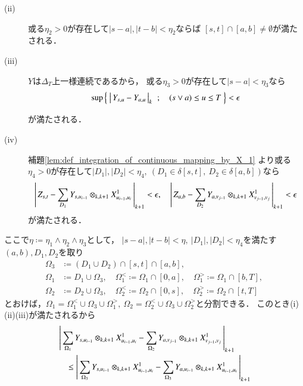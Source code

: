 \begin{prf}
\begin{description}
\begin{description}
					\item[(ii)] 或る$\eta_2 > 0$が存在して$|s-a|,|t-b| < \eta_2$ならば
						$[s,t] \cap [a,b] \neq \emptyset$が満たされる．
						
					\item[(iii)] $Y$は$\Delta_T$上一様連続であるから，
						或る$\eta_3 > 0$が存在して$|s-a| < \eta_3$なら
						\begin{align}
							\operatorname*{sup}_{} \left\{\ \left|\, Y_{s,u} - Y_{a,u}\, \right|_{k}\ \, ; \quad (s \vee a) \leq u \leq T\ \right\} < \epsilon
						\end{align}
						が満たされる．
						
					\item[(iv)] 補題\ref{lem:def_integration_of_continuous_mapping_by_X_1}
						より或る$\eta_4 > 0$が存在して$|D_1|,|D_2| < \eta_4,\ 
						(D_1 \in \delta[s,t],\ D_2 \in \delta[a,b])$なら
						\begin{align}
							\left|\, Z_{s,t} - \sum_{D_1} Y_{s,u_{i-1}} \otimes_{k,k+1} X^1_{u_{i-1},u_i}\, \right|_{k+1} < \epsilon,
					\quad \left|\, Z_{a,b} - \sum_{D_2} Y_{a,v_{j-1}} \otimes_{k,k+1} X^1_{v_{j-1},v_j}\, \right|_{k+1} < \epsilon
						\end{align}
						が満たされる．
				\end{description}
				ここで$\eta \coloneqq \eta_1 \wedge \eta_2 \wedge \eta_3$として，
				$|s-a|,|t-b| < \eta,\ |D_1|,|D_2| < \eta_4$を満たす$(a,b),D_1,D_2$を取り
				\begin{align}
					\Omega_3 &\coloneqq (D_1 \cup D_2) \cap [s,t] \cap [a,b], \\
					\Omega_1 &\coloneqq D_1 \cup \Omega_3,
						\quad \Omega_1^< \coloneqq \Omega_1 \cap [0,a],
						\quad \Omega_1^> \coloneqq \Omega_1 \cap [b,T], \\
					\Omega_2 &\coloneqq D_2 \cup \Omega_3,
						\quad \Omega_2^< \coloneqq \Omega_2 \cap [0,s],
						\quad \Omega_2^> \coloneqq \Omega_2 \cap [t,T]
				\end{align}
				とおけば，$\Omega_1 = \Omega_1^< \cup \Omega_3 \cup \Omega_1^>,\ 
				\Omega_2 = \Omega_2^< \cup \Omega_3 \cup \Omega_2^>$と分割できる．
				このとき(i)(ii)(iii)が満たされるから
				\begin{align}
					&\compcrossnorm{\sum_{\Omega_1} Y_{s,u_{i-1}} \otimes_{k,k+1} X^1_{u_{i-1},u_i}
						- \sum_{\Omega_2} Y_{a,v_{j-1}} \otimes_{k,k+1} X^1_{v_{j-1},v_j}}{k+1} \\
					&\quad\leq \compcrossnorm{\sum_{\Omega_3} Y_{s,u_{i-1}} \otimes_{k,k+1} X^1_{u_{i-1},u_i}
						- \sum_{\Omega_3} Y_{a,u_{i-1}} \otimes_{k,k+1} X^1_{u_{i-1},u_i}}{k+1} \\

\end{align}
\end{description}
\end{prf}
